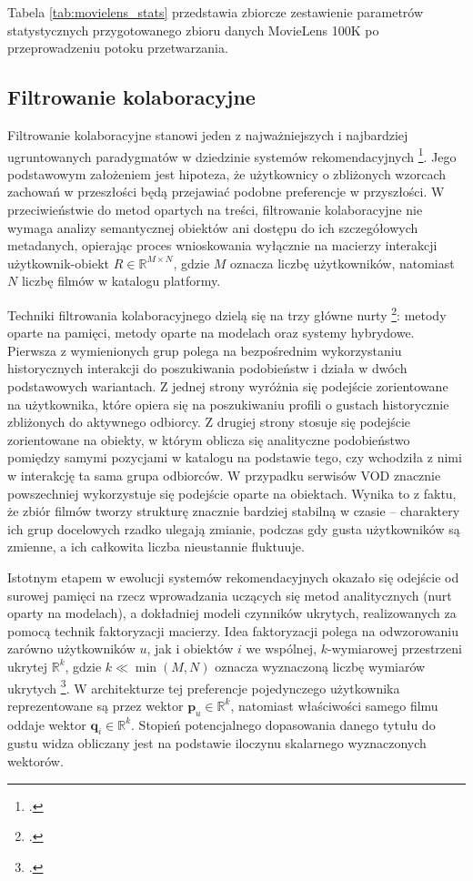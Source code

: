 Tabela \ref{tab:movielens_stats} przedstawia zbiorcze zestawienie parametrów statystycznych przygotowanego zbioru danych MovieLens 100K po przeprowadzeniu potoku przetwarzania.



\subsection{Filtrowanie kolaboracyjne}

Filtrowanie kolaboracyjne stanowi jeden z najważniejszych i najbardziej ugruntowanych paradygmatów w dziedzinie systemów rekomendacyjnych \footcite{korenMatrixFactorizationTechniques2009, krawczukSystemyRekomendacyjne2024}. Jego podstawowym założeniem jest hipoteza, że użytkownicy o zbliżonych wzorcach zachowań w przeszłości będą przejawiać podobne preferencje w przyszłości. W przeciwieństwie do metod opartych na treści, filtrowanie kolaboracyjne nie wymaga analizy semantycznej obiektów ani dostępu do ich szczegółowych metadanych, opierając proces wnioskowania wyłącznie na macierzy interakcji użytkownik-obiekt $R \in \mathbb{R}^{M \times N}$, gdzie $M$ oznacza liczbę użytkowników, natomiast $N$ liczbę filmów w katalogu platformy.


Techniki filtrowania kolaboracyjnego dzielą się na trzy główne nurty \footcite{suSurveyCollaborativeFiltering2009}: metody oparte na pamięci, metody oparte na modelach oraz systemy hybrydowe. Pierwsza z wymienionych grup polega na bezpośrednim wykorzystaniu historycznych interakcji do poszukiwania podobieństw i działa w dwóch podstawowych wariantach. Z jednej strony wyróżnia się podejście zorientowane na użytkownika, które opiera się na poszukiwaniu profili o gustach historycznie zbliżonych do aktywnego odbiorcy. Z drugiej strony stosuje się podejście zorientowane na obiekty, w którym oblicza się analityczne podobieństwo pomiędzy samymi pozycjami w katalogu na podstawie tego, czy wchodziła z nimi w interakcję ta sama grupa odbiorców. W przypadku serwisów VOD znacznie powszechniej wykorzystuje się podejście oparte na obiektach. Wynika to z faktu, że zbiór filmów tworzy strukturę znacznie bardziej stabilną w czasie -- charaktery ich grup docelowych rzadko ulegają zmianie, podczas gdy gusta użytkowników są zmienne, a ich całkowita liczba nieustannie fluktuuje.

Istotnym etapem w ewolucji systemów rekomendacyjnych okazało się odejście od surowej pamięci na rzecz wprowadzania uczących się metod analitycznych (nurt oparty na modelach), a dokładniej modeli czynników ukrytych, realizowanych za pomocą technik faktoryzacji macierzy. Idea faktoryzacji polega na odwzorowaniu zarówno użytkowników $u$, jak i obiektów $i$ we wspólnej, $k$-wymiarowej przestrzeni ukrytej $\mathbb{R}^k$, gdzie $k \ll \min(M, N)$ oznacza wyznaczoną liczbę wymiarów ukrytych \footcite{rendleBPRBayesianPersonalized2009}. W architekturze tej preferencje pojedynczego użytkownika reprezentowane są przez wektor $\mathbf{p}_u \in \mathbb{R}^k$, natomiast właściwości samego filmu oddaje wektor $\mathbf{q}_i \in \mathbb{R}^k$. Stopień potencjalnego dopasowania danego tytułu do gustu widza obliczany jest na podstawie iloczynu skalarnego wyznaczonych wektorów.

